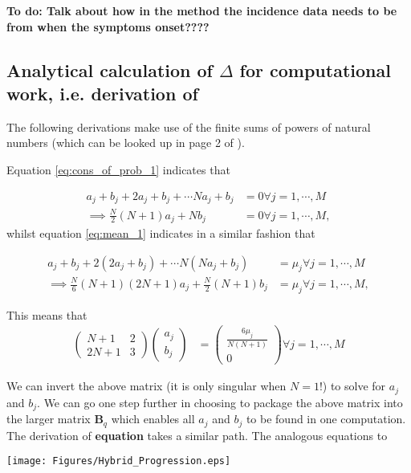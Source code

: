 \documentclass[10pt,journal,compsoc]{IEEEtran}
\begin{document}
\textbf{To do: Talk about how in the method the incidence data needs to be from when the symptoms onset????}

\subsection{Analytical calculation of $\Delta$ for computational work, i.e. derivation of}

The following derivations make use of the finite sums of powers of natural numbers (which can be looked up in page 2 of \cite{Gradshteyn-Ryzhik-0}).

Equation \ref{eq:cons_of_prob_1} indicates that

\begin{align*}
    a_j + b_j + 2a_j + b_j + \cdots Na_j + b_j &= 0 \forall j = 1, \cdots , M \\
    \implies \frac{N}{2}(N+1)a_j + Nb_j &= 0 \forall j =1, \cdots , M,
\end{align*}
whilst equation \ref{eq:mean_1} indicates in a similar fashion that

\begin{align*}
    a_j + b_j + 2(2a_j+b_j) + \cdots N(Na_j + b_j) &= \mu_j \forall j = 1, \cdots , M \\
    \implies \frac{N}{6}(N+1)(2N+1)a_j + \frac{N}{2}(N+1)b_j &= \mu_j \forall j =1, \cdots , M,
\end{align*}

This means that 
\begin{align*}
\begin{pmatrix}
    N+1 & 2\\
    2N+1 & 3
    \end{pmatrix}
    \begin{pmatrix}
    a_j\\
    b_j
    \end{pmatrix}
    &= \begin{pmatrix}
    \frac{6\mu_j}{N(N+1)}\\
    0
    \end{pmatrix} \forall j = 1, \cdots ,M
\end{align*}

We can invert the above matrix (it is only singular when $N=1$!) to solve for $a_j$ and $b_j$. We can go one step further in choosing to package the above matrix into the larger matrix $\boldsymbol{B}_q$ which enables all $a_j$ and $b_j$ to be found in one computation.\\

The derivation of \textbf{equation} takes a similar path. The analogous equations to 

\begin{figure*}
\centering
\texttt{[image: Figures/Hybrid\_Progression.eps]}
\label{fig:Hybrid_Progression}
\end{figure*}


\end{document}

